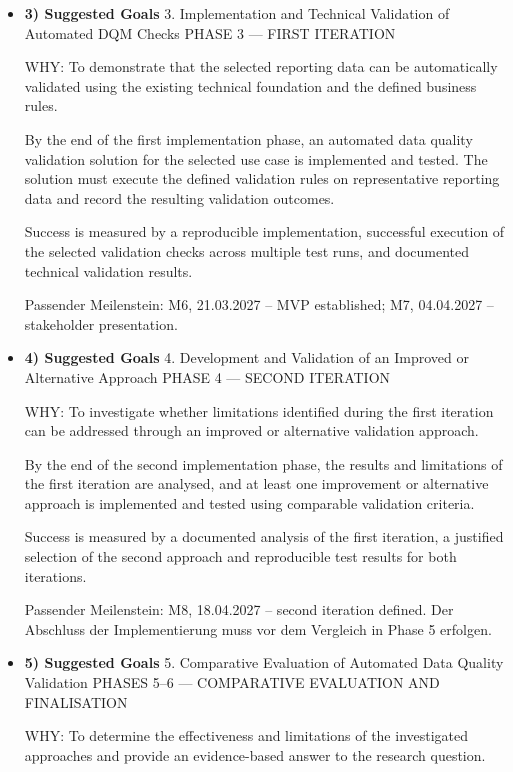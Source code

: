 \begin{itemize}
Passender Meilenstein: M3, 29.11.2026 – Error documentation started.

\item \textbf{3) Suggested Goals}
3. Implementation and Technical Validation of Automated DQM Checks
PHASE 3 — FIRST ITERATION

WHY: To demonstrate that the selected reporting data can be automatically validated using the existing technical foundation and the defined business rules.

By the end of the first implementation phase, an automated data quality validation solution for the selected use case is implemented and tested. The solution must execute the defined validation rules on representative reporting data and record the resulting validation outcomes.

Success is measured by a reproducible implementation, successful execution of the selected validation checks across multiple test runs, and documented technical validation results.

Passender Meilenstein: M6, 21.03.2027 – MVP established; M7, 04.04.2027 – stakeholder presentation.

\item \textbf{4) Suggested Goals}
4. Development and Validation of an Improved or Alternative Approach
PHASE 4 — SECOND ITERATION

WHY: To investigate whether limitations identified during the first iteration can be addressed through an improved or alternative validation approach.

By the end of the second implementation phase, the results and limitations of the first iteration are analysed, and at least one improvement or alternative approach is implemented and tested using comparable validation criteria.

Success is measured by a documented analysis of the first iteration, a justified selection of the second approach and reproducible test results for both iterations.

Passender Meilenstein: M8, 18.04.2027 – second iteration defined. Der Abschluss der Implementierung muss vor dem Vergleich in Phase 5 erfolgen.

\item \textbf{5) Suggested Goals}
5. Comparative Evaluation of Automated Data Quality Validation
PHASES 5–6 — COMPARATIVE EVALUATION AND FINALISATION

WHY: To determine the effectiveness and limitations of the investigated approaches and provide an evidence-based answer to the research question.


\end{itemize}
